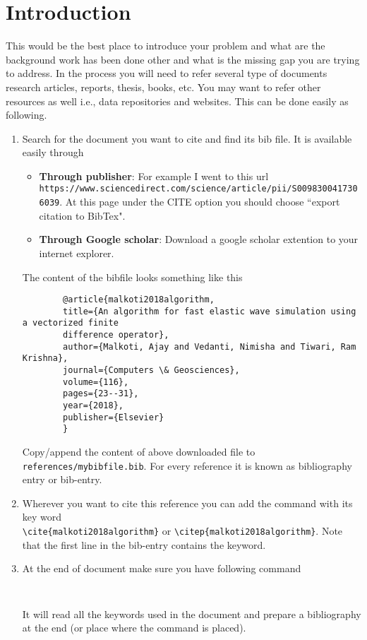 \chapter{Introduction}
This would be the best place to introduce your problem and what are the background work has been done other and what is the missing gap you are trying to address. In the process you will need to refer several type of documents research articles, reports, thesis, books, etc. You may want to refer other resources as well i.e., data repositories and websites. This can be done easily as following. 

\begin{enumerate}[leftmargin=*,label={Step \arabic*:}]
\item 	Search for the document you want to cite and find its bib file. 
		It is available easily through 
		\begin{itemize}	
		\item 	\textbf{Through publisher}: For example I went to this url\\
				\verb|https://www.sciencedirect.com/science/article/pii/S0098300417306039|. At this page under the CITE option you should choose ``export citation to BibTex". 
				
		\item 	\textbf{Through Google scholar}: Download a google scholar extention to your internet explorer.
		\end{itemize}
		The content of the bibfile looks something like this
		\begin{verbatim}
		@article{malkoti2018algorithm,
		title={An algorithm for fast elastic wave simulation using a vectorized finite 
		difference operator},
		author={Malkoti, Ajay and Vedanti, Nimisha and Tiwari, Ram Krishna},
		journal={Computers \& Geosciences},
		volume={116},
		pages={23--31},
		year={2018},
		publisher={Elsevier}
		}		
		\end{verbatim}
		 
 		Copy/append the content of above downloaded file to \verb|references/mybibfile.bib|.
 		For every reference it is known as bibliography entry or bib-entry. 
 		
\item  	Wherever you want to cite this reference you can add the command with its key word \\ 
		\verb|\cite{malkoti2018algorithm}| or \verb|\citep{malkoti2018algorithm}|.  
		Note that the first line in the bib-entry contains the keyword.

\item 	At the end of document make sure you have following command 		
		\begin{verbatim}
			
		\end{verbatim}
		It will read all the keywords  used in the document and prepare a bibliography at the end (or place where the command is placed).

\end{enumerate}	
